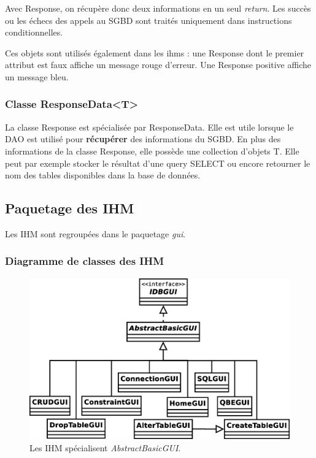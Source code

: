 Avec Response, on récupère donc deux informations en un seul \textit{return}.
Les succès ou les échecs des appels au SGBD sont traités uniquement dans instructions conditionnelles.

Ces objets sont utilisés également dans les \glspl{ihm} : une Response dont le premier attribut est faux affiche un message rouge d'erreur.
Une Response positive affiche un message bleu.

\subsubsection{Classe ResponseData<T>}
La classe Response est spécialisée par ResponseData.
Elle est utile lorsque le DAO est utilisé pour \textbf{récupérer} des informations du SGBD.
En plus des informations de la classe Response, elle possède une collection d'objets T.
Elle peut par exemple stocker le résultat d'une \gls{query} SELECT ou encore retourner le nom des tables disponibles dans la base de données.

\subsection{Paquetage des IHM}
Les IHM sont regroupées dans le paquetage \textit{gui}.

\subsubsection{Diagramme de classes des IHM}
\begin{figure}[!h]
\centering
\includegraphics[width=14cm]{images/gui.eps}
\caption{Les IHM spécialisent \textit{AbstractBasicGUI}.}
\label{hierarchie_des_ihm}
\end{figure}

